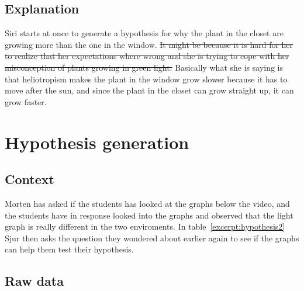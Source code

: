 \subsection{Explanation}
Siri starts at once to generate a hypothesis for why the plant in the closet are growing more than the one in the window. \sout{It might be because it is hard for her to realize that her expectations where wrong and she is trying to cope with her misconception of plants growing in green light.} Basically what she is saying is that heliotropism makes the plant in the window grow slower because it has to move after the sun, and since the plant in the closet can grow straight up, it can grow faster. 

\section{Hypothesis generation}

\subsection{Context}
Morten has asked if the students has looked at the graphs below the video, and the students have in response looked into the graphs and observed that the light graph is really different in the two enviroments. In  table~\ref{excerpt:hypothesis2} Sjur then asks the question they wondered about earlier again to see if the graphs can help them test their hypothesis. 

\subsection{Raw data}

